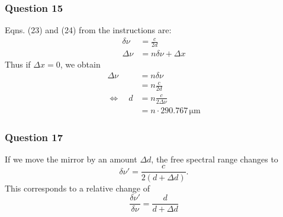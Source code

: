 \subsubsection{Question 15}
Eqns. (23) and (24) from the instructions are:
\begin{align}
	\delta\nu&=\frac{c}{2d} \label{eq:FSR}\\
	\Delta \nu&= n\delta\nu +\Delta x
\end{align}
Thus if $\Delta x=0$, we obtain 
\begin{align}
	\Delta \nu &=n \delta \nu \nonumber\\
	&= n \frac{c}{2d} \\
	\Leftrightarrow \quad d &= n \frac{c}{2\Delta \nu} \\ 
	&= n \cdot 290.767 \,\si{\micro\metre} \label{eq:fpikalibration}
\end{align}

\subsubsection{Question 17}
If we move the mirror by an amount $\Delta d$, the free spectral range changes to
\begin{equation}
	\delta\nu'=\frac{c}{2(d+\Delta d)}.
\end{equation}
This corresponds to a relative change of
\begin{equation}
	\frac{\delta \nu'}{\delta\nu}=\frac{d}{d+\Delta d}
\end{equation}